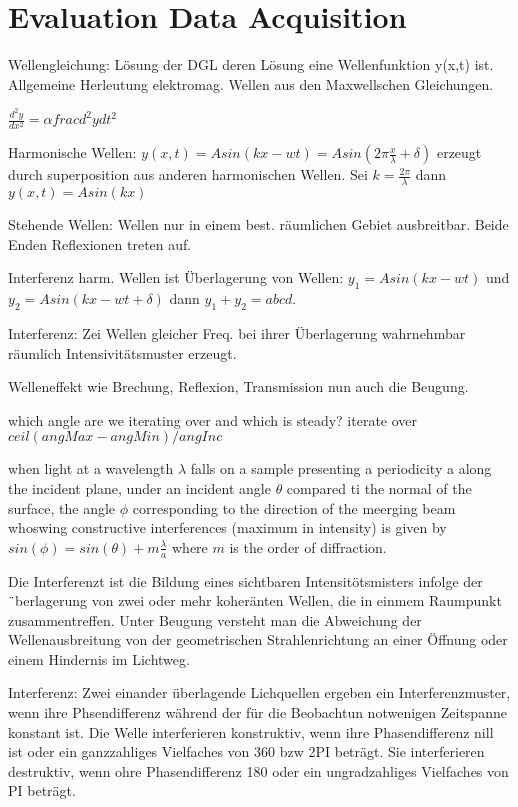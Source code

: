 
\section{Evaluation Data Acquisition}

Wellengleichung: Lösung der DGL deren Lösung eine Wellenfunktion y(x,t) ist. Allgemeine Herleutung elektromag. Wellen aus den Maxwellschen Gleichungen.

$\frac{d^2 y}{dx^2} = \alpha frac{d^2 y}{dt^2}$

Harmonische Wellen: $y(x,t) = A sin(kx - wt) = A sin(2\pi \frac{x}{\lambda} + \delta)$ erzeugt durch superposition aus anderen harmonischen Wellen. Sei $k = \frac{2 \pi}{\lambda}$ dann $y(x,t) = A sin(kx)$

Stehende Wellen: Wellen nur in einem best. räumlichen Gebiet ausbreitbar. Beide Enden Reflexionen treten auf.

Interferenz harm. Wellen ist Überlagerung von Wellen: $y_1 = A sin(kx - wt)$ und $y_2 = A sin(kx - wt + \delta)$ dann $y_1 + y_2 = abcd$.

Interferenz: Zei Wellen gleicher Freq. bei ihrer Überlagerung wahrnehmbar räumlich Intensivitätsmuster erzeugt.

Welleneffekt wie Brechung, Reflexion, Transmission nun auch die Beugung.

which angle are we iterating over and which is steady?
iterate over $ceil(angMax - angMin) / angInc$

when light at a wavelength $\lambda$ falls on a sample presenting a periodicity a along the incident plane, under an incident angle $\theta$ compared ti the normal of the surface, the angle $\phi$ corresponding to the direction of the meerging beam whoswing constructive interferences (maximum in intensity) is given by $sin(\phi) = sin(\theta) + m\frac{\lambda}{a}$
where $m$ is the order of diffraction. 




Die Interferenzt ist die Bildung eines sichtbaren Intensitötsmisters infolge der ¨berlagerung von zwei oder mehr koheränten Wellen, die in einmem Raumpunkt zusammentreffen. Unter Beugung versteht man die Abweichung der Wellenausbreitung von der geometrischen Strahlenrichtung an einer Öffnung oder einem Hindernis im Lichtweg.

Interferenz: Zwei einander überlagende Lichquellen ergeben ein Interferenzmuster, wenn ihre Phsendifferenz während der für die Beobachtun notwenigen Zeitspanne konstant ist. Die Welle interferieren konstruktiv, wenn ihre Phasendifferenz nill ist oder ein ganzzahliges Vielfaches von 360 bzw 2PI beträgt. Sie interferieren destruktiv, wenn ohre Phasendifferenz 180 oder ein ungradzahliges Vielfaches von PI beträgt.



